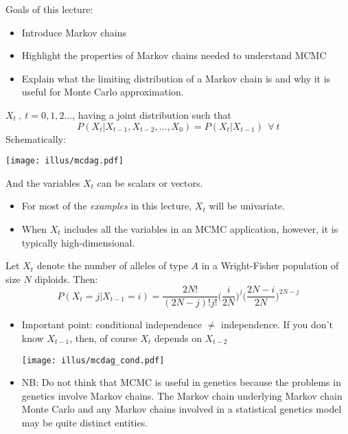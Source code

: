 



Goals of this lecture:
\begin{itemize}
\item Introduce Markov chains
\item Highlight the properties of Markov chains needed to understand MCMC
\item Explain what the limiting distribution of a Markov chain
is and why it is useful for Monte Carlo approximation.
\end{itemize}


$X_t~,~t=0,1,2\ldots$, having a joint distribution such that 
\[
	P(X_t|X_{t-1},X_{t-2},\ldots,X_0) = P(X_t|X_{t-1})~~\forall~t
\]
Schematically:
\begin{center}
\texttt{[image: illus/mcdag.pdf]}
\end{center}
And the variables $X_t$ can be scalars or vectors.  
\begin{itemize}
\item For most of the {\em examples} in this lecture, $X_t$ will be univariate.
\item When $X_t$ includes all the variables in an MCMC application, however, it is typically high-dimensional.
\end{itemize}



Let $X_t$ denote the number of alleles of type $A$ in a Wright-Fisher population of size $N$ diploids.  Then:
\[
P(X_t=j|X_{t-1}=i) = \frac{2N!}{(2N-j)!j!} \biggl({\textstyle \frac{i}{2N}}\biggr)^j
\biggl({\textstyle \frac{2N-i}{2N}}\biggr)^{2N-j}
\]
\begin{itemize}
\item Important point:  conditional independence $\neq$ independence.  If you don't know $X_{t-1}$, then, of course $X_{t}$ depends on $X_{t-2}$
\begin{center}
\texttt{[image: illus/mcdag\_cond.pdf]}
\end{center}

\item NB: Do not think that MCMC is useful in genetics because the problems in genetics involve Markov chains.  The Markov chain underlying Markov chain Monte Carlo and any Markov chains involved in a statistical genetics model may be quite distinct entities.  
\end{itemize}
   


